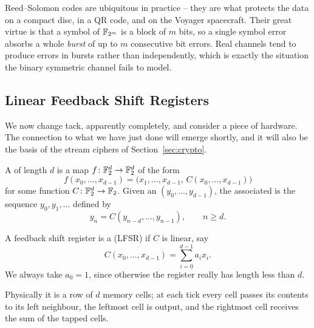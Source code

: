 \documentclass[a4paper]{scrartcl}
\begin{document}
\begin{remark}
	Reed--Solomon codes are ubiquitous in practice -- they are what protects the data on a compact disc, in a QR code, and on the Voyager spacecraft. Their great virtue is that a symbol of $\mathbb{F}_{2^m}$ is a block of $m$ bits, so a single symbol error absorbs a whole \emph{burst} of up to $m$ consecutive bit errors. Real channels tend to produce errors in bursts rather than independently, which is exactly the situation the binary symmetric channel fails to model.
\end{remark}

\subsection{Linear Feedback Shift Registers}

We now change tack, apparently completely, and consider a piece of hardware. The connection to what we have just done will emerge shortly, and it will also be the basis of the stream ciphers of Section~\ref{sec:crypto}.

\begin{definition}
	A  of length $d$ is a map $f\colon\mathbb{F}_2^d\to\mathbb{F}_2^d$ of the form
	$$f(x_0,\dots,x_{d-1}) = \bigl(x_1,\dots,x_{d-1},\,C(x_0,\dots,x_{d-1})\bigr)$$
	for some function $C\colon\mathbb{F}_2^d\to\mathbb{F}_2$. Given an  $(y_0,\dots,y_{d-1})$, the associated  is the sequence $y_0,y_1,\dots$ defined by
	$$y_n = C(y_{n-d},\dots,y_{n-1}), \qquad n \ge d.$$
\end{definition}

\begin{definition}[LFSR]
	A feedback shift register is a  (LFSR) if $C$ is linear, say
	$$C(x_0,\dots,x_{d-1}) = \sum_{i=0}^{d-1}a_ix_i.$$
	We always take $a_0 = 1$, since otherwise the register really has length less than $d$.
\end{definition}

Physically it is a row of $d$ memory cells; at each tick every cell passes its contents to its left neighbour, the leftmost cell is output, and the rightmost cell receives the sum of the tapped cells.
\end{document}
